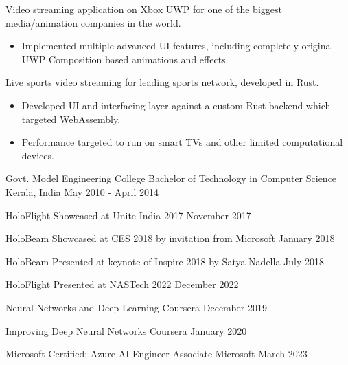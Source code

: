 \documentclass[11pt, a4paper]{awesome-cv}
\begin{document}
\begin{cventries}
{\begin{cvitems}
\begin{itemize}
				\end{itemize}
\vspace{1mm}
			\item Video streaming application on Xbox UWP for one of the biggest media/animation companies in the world.
				\begin{itemize}
					\item Implemented multiple advanced UI features, including completely original UWP Composition based animations and effects.
				\end{itemize}
\vspace{1mm}
			\item Live sports video streaming for leading sports network, developed in Rust.
				\begin{itemize}
					\item Developed UI and interfacing layer against a custom Rust backend which targeted WebAssembly.
					\item Performance targeted to run on smart TVs and other limited computational devices.
				\end{itemize}
		\end{cvitems}
	}
\end{cventries}

\vspace{-1mm}
\begin{cventries}
	\cventry
	{Govt. Model Engineering College} %
	{Bachelor of Technology in Computer Science} %
	{Kerala, India} %
	{May 2010 - April 2014} %
	{
	}
\end{cventries}


\vspace{-6mm}
\begin{cvhonors}
	\cvrecognition
		{HoloFlight} %
		{Showcased at Unite India 2017} %
		{November 2017} %
		{}
		
	\cvrecognition
		{HoloBeam} %
		{Showcased at CES 2018 by invitation from Microsoft} %
		{January 2018} %
		{}
		
	\cvrecognition
		{HoloBeam} %
		{Presented at keynote of Inspire 2018 by Satya Nadella} %
		{July 2018} %
		{}

	\cvrecognition
		{HoloFlight} %
		{Presented at NASTech 2022} %
		{December 2022} %
		{}
\end{cvhonors}

\vspace{2mm}
\begin{cvhonors}
	\cvcertification
	{Neural Networks and Deep Learning} %
	{Coursera} %
	{December 2019} %
	{}

	\cvcertification
	{Improving Deep Neural Networks} %
	{Coursera} %
	{January 2020} %
	{}

	\cvcertification
	{Microsoft Certified: Azure AI Engineer Associate} %
	{Microsoft} %
	{March 2023} %
	{}
\end{cvhonors}
\end{document}
